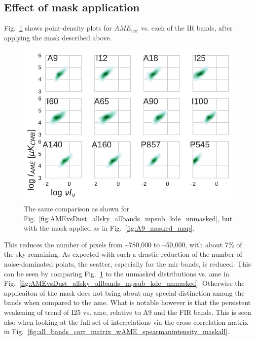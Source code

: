         \subsection{Effect of mask application}
            Fig.~\ref{fig:AMEvsDust_allsky_allbands_mpsub_kde_masked} shows point-density plots for $AME_{var}$ vs. each of the IR bands, after applying the mask described above.
               \begin{figure}
                 \includegraphics[width=\textwidth]{../Plots/ch_allsky/AMEvsDust_allsky_allbands_mpsub_kde_masked.pdf}
                 \centering
                 \caption{The same comparison as shown for Fig.~\ref{fig:AMEvsDust_allsky_allbands_mpsub_kde_unmasked}, but with the mask applied as in Fig.~\ref{fig:A9_masked_map}.}
                 \label{fig:AMEvsDust_allsky_allbands_mpsub_kde_masked}
               \end{figure}
            This reduces the number of pixels from \textasciitilde{}780,000 to \textasciitilde{}50,000, with about 7\% of the sky remaining. As expected with such a drastic reduction of the number of noise-dominated points, the scatter, especially for the \gls{mir} bands, is reduced. This can be seen by comparing Fig.~\ref{fig:AMEvsDust_allsky_allbands_mpsub_kde_masked} to the unmasked distributions vs. \gls{ame} in Fig.~\ref{fig:AMEvsDust_allsky_allbands_mpsub_kde_unmasked}. Otherwise the applicaiton of the mask does not bring about any special distinction among the bands when compared to the \gls{ame}. What is notable however is that the persistent weakening of trend of I25 vs. \gls{ame}, relative to A9 and the FIR bands. This is seen also when looking at the full set of interrelations via the cross-correlation matrix in Fig.~\ref{fig:all_bands_corr_matrix_wAME_spearmanintensity_maskall}.

